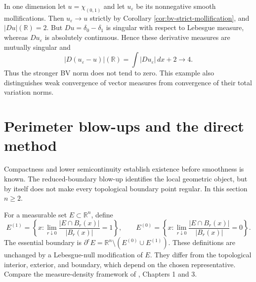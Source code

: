 \begin{example}\label{ex:bv-strict-not-norm}
In one dimension let $u=\chi_{(0,1)}$ and let $u_\varepsilon$ be its nonnegative smooth mollifications. Then $u_\varepsilon\to u$ strictly by Corollary \ref{cor:bv-strict-mollification}, and $|Du|(\mathbb R)=2$. But $Du=\delta_0-\delta_1$ is singular with respect to Lebesgue measure, whereas $Du_\varepsilon$ is absolutely continuous. Hence these derivative measures are mutually singular and
\[
 |D(u_\varepsilon-u)|(\mathbb R)=\int|Du_\varepsilon|\,dx+2\longrightarrow4.
\]
Thus the stronger BV norm does not tend to zero. This example also distinguishes weak convergence of vector measures from convergence of their total variation norms.
\end{example}

\chapter{Perimeter blow-ups and the direct method}\label{sec:perimeter-direct-method}
Compactness and lower semicontinuity establish existence before smoothness is known. The reduced-boundary blow-up identifies the local geometric object, but by itself does not make every topological boundary point regular. In this section $n\geq2$.

\begin{definition}\label{def:measure-theoretic-boundary}
For a measurable set $E\subset\mathbb R^n$, define
\[
 E^{(1)}=\left\{x:\lim_{r\downarrow0}\frac{|E\cap B_r(x)|}{|B_r(x)|}=1\right\},
 \qquad
 E^{(0)}=\left\{x:\lim_{r\downarrow0}\frac{|E\cap B_r(x)|}{|B_r(x)|}=0\right\}.
\]
The essential boundary is $\partial^eE=\mathbb R^n\setminus(E^{(0)}\cup E^{(1)})$. These definitions are unchanged by a Lebesgue-null modification of $E$. They differ from the topological interior, exterior, and boundary, which depend on the chosen representative. Compare the measure-density framework of \cite{Sim18}, Chapters 1 and 3.
\end{definition}

